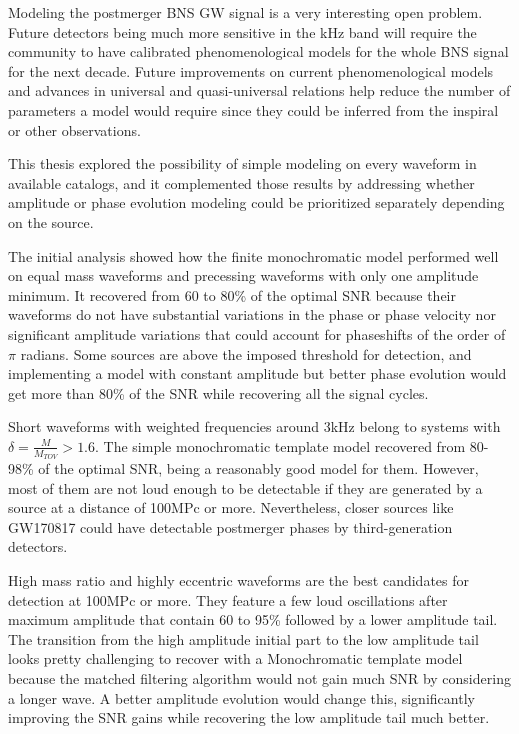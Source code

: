 Modeling the postmerger BNS GW signal is a very interesting open problem. Future detectors being much more sensitive in the kHz band will require the community to have calibrated phenomenological models for the whole BNS signal for the next decade. Future improvements on current phenomenological models and advances in universal and quasi-universal relations help reduce the number of parameters a model would require since they could be inferred from the inspiral or other observations.

This thesis explored the possibility of simple modeling on every waveform in available catalogs, and it complemented those results by addressing whether amplitude or phase evolution modeling could be prioritized separately depending on the source. 
 
The initial analysis showed how the finite monochromatic model performed well on equal mass waveforms and precessing waveforms with only one amplitude minimum. It recovered from 60 to 80\% of the optimal SNR because their waveforms do not have substantial variations in the phase or phase velocity nor significant amplitude variations that could account for phaseshifts of the order of $\pi$ radians. Some sources are above the imposed threshold for detection, and implementing a model with constant amplitude but better phase evolution would get more than 80\% of the SNR while recovering all the signal cycles.

Short waveforms with weighted frequencies around 3kHz belong to systems with $\delta=\frac{M}{M_{TOV}} > 1.6$. The simple monochromatic template model recovered from 80-98\% of the optimal SNR, being a reasonably good model for them. However, most of them are not loud enough to be detectable if they are generated by a source at a distance of 100MPc or more. Nevertheless, closer sources like GW170817 could have detectable postmerger phases by third-generation detectors.

High mass ratio and highly eccentric waveforms are the best candidates for detection at 100MPc or more. They feature a few loud oscillations after maximum amplitude that contain 60 to 95\% followed by a lower amplitude tail. The transition from the high amplitude initial part to the low amplitude tail looks pretty challenging to recover with a Monochromatic template model because the matched filtering algorithm would not gain much SNR by considering a longer wave. A better amplitude evolution would change this, significantly improving the SNR gains while recovering the low amplitude tail much better.


